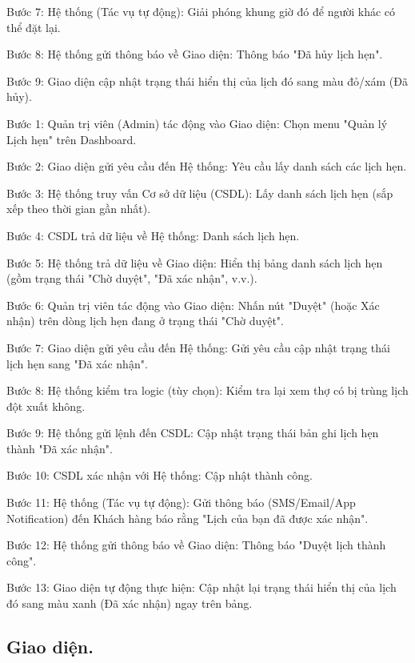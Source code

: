\documentclass[../BTL.tex]{subfiles}
\begin{document}
Bước 7: Hệ thống (Tác vụ tự động): Giải phóng khung giờ đó để người khác
có thể đặt lại.

Bước 8: Hệ thống gửi thông báo về Giao diện: Thông báo "Đã hủy lịch
hẹn".

Bước 9: Giao diện cập nhật trạng thái hiển thị của lịch đó sang màu
đỏ/xám (Đã hủy).


Bước 1: Quản trị viên (Admin) tác động vào Giao diện: Chọn menu "Quản lý
Lịch hẹn" trên Dashboard.

Bước 2: Giao diện gửi yêu cầu đến Hệ thống: Yêu cầu lấy danh sách các
lịch hẹn.

Bước 3: Hệ thống truy vấn Cơ sở dữ liệu (CSDL): Lấy danh sách lịch hẹn
(sắp xếp theo thời gian gần nhất).

Bước 4: CSDL trả dữ liệu về Hệ thống: Danh sách lịch hẹn.

Bước 5: Hệ thống trả dữ liệu về Giao diện: Hiển thị bảng danh sách lịch
hẹn (gồm trạng thái "Chờ duyệt", "Đã xác nhận", v.v.).

Bước 6: Quản trị viên tác động vào Giao diện: Nhấn nút "Duyệt" (hoặc Xác
nhận) trên dòng lịch hẹn đang ở trạng thái "Chờ duyệt".

Bước 7: Giao diện gửi yêu cầu đến Hệ thống: Gửi yêu cầu cập nhật trạng
thái lịch hẹn sang "Đã xác nhận".

Bước 8: Hệ thống kiểm tra logic (tùy chọn): Kiểm tra lại xem thợ có bị
trùng lịch đột xuất không.

Bước 9: Hệ thống gửi lệnh đến CSDL: Cập nhật trạng thái bản ghi lịch hẹn
thành "Đã xác nhận".

Bước 10: CSDL xác nhận với Hệ thống: Cập nhật thành công.

Bước 11: Hệ thống (Tác vụ tự động): Gửi thông báo (SMS/Email/App
Notification) đến Khách hàng báo rằng "Lịch của bạn đã được xác nhận".

Bước 12: Hệ thống gửi thông báo về Giao diện: Thông báo "Duyệt lịch
thành công".

Bước 13: Giao diện tự động thực hiện: Cập nhật lại trạng thái hiển thị
của lịch đó sang màu xanh (Đã xác nhận) ngay trên bảng.

\subsection{Giao diện.}
\end{document}
